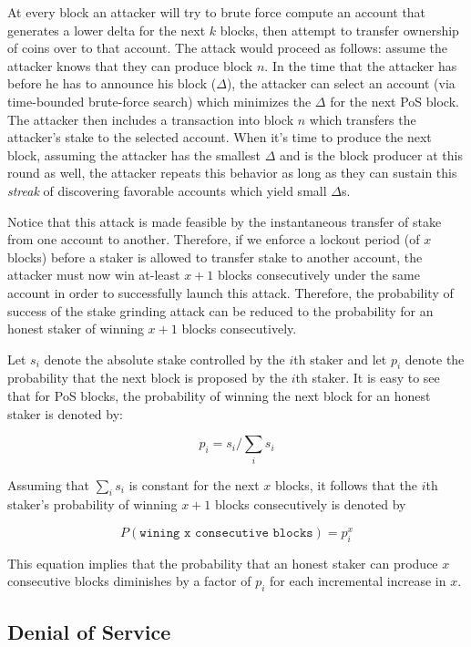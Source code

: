 At every block an attacker will try to brute force compute an account that generates a lower delta for the next $k$ blocks, then attempt to transfer ownership of coins over to that account. The attack would proceed as follows: assume the attacker knows that they can produce block $n$. In the time that the attacker has before he has to announce his block ($\Delta$), the attacker can select an account (via time-bounded brute-force search) which minimizes the $\Delta$ for the next PoS block. The attacker then includes a transaction into block $n$ which transfers the attacker's stake to the selected account. When it's time to produce the next block, assuming the attacker has the smallest $\Delta$ and is the block producer at this round as well, the attacker repeats this behavior as long as they can sustain this \emph{streak} of discovering favorable accounts which yield small $\Delta$s. 

Notice that this attack is made feasible by the instantaneous transfer of stake from one account to another. Therefore, if we enforce a lockout period (of $x$ blocks) before a staker is allowed to transfer stake to another account, the attacker must now win at-least $x+1$ blocks consecutively under the same account in order to successfully launch this attack. Therefore, the probability of success of the stake grinding attack can be reduced to the probability for an honest staker of winning $x+1$ blocks consecutively.

Let $s_i$ denote the absolute stake controlled by the $i$th staker and let $p_i$ denote the probability that the next block is proposed by the $i$th staker. It is easy to see that for PoS blocks, the probability of winning the next block for an honest staker is denoted by: 

$$p_i=s_{i}/\sum_i{s_i}$$

Assuming that $\sum_i{s_i}$ is constant for the next $x$ blocks, it follows that the $i$th staker's probability of winning $x+1$ blocks consecutively is denoted by

\begin{equation}
    \label{eq:attacker_success}
    P(\texttt{wining x consecutive blocks})=p_i^{x}
\end{equation}

This equation implies that the probability that an honest staker can produce $x$ consecutive blocks diminishes by a factor of $p_i$ for each incremental increase in $x$. 

\subsection{Denial of Service}

